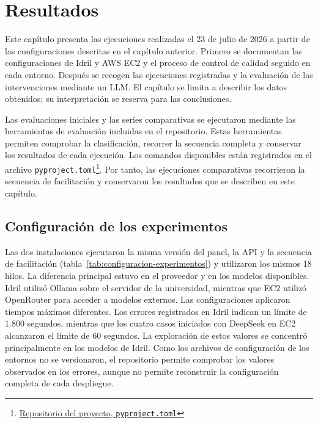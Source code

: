 \chapter{Resultados}
\label{chap:resultados}

Este capítulo presenta las ejecuciones realizadas el 23 de julio de 2026 a partir de las configuraciones descritas en el capítulo anterior. Primero se documentan las configuraciones de Idril y AWS EC2 y el proceso de control de calidad seguido en cada entorno. Después se recogen las ejecuciones registradas y la evaluación de las intervenciones mediante un LLM. El capítulo se limita a describir los datos obtenidos; su interpretación se reserva para las conclusiones.

Las evaluaciones iniciales y las series comparativas se ejecutaron mediante las herramientas de evaluación incluidas en el repositorio. Estas herramientas permiten comprobar la clasificación, recorrer la secuencia completa y conservar los resultados de cada ejecución. Los comandos disponibles están registrados en el archivo \texttt{pyproject.toml}\footnote{\href{https://github.com/magrimal/tfm-2026-discussion-moderation/blob/main/pyproject.toml}{Repositorio del proyecto, \texttt{pyproject.toml}}}. Por tanto, las ejecuciones comparativas recorrieron la secuencia de facilitación y conservaron los resultados que se describen en este capítulo.

\section{Configuración de los experimentos}

Las dos instalaciones ejecutaron la misma versión del panel, la API y la secuencia de facilitación (tabla~\ref{tab:configuracion-experimentos}) y utilizaron los mismos 18 hilos. La diferencia principal estuvo en el proveedor y en los modelos disponibles. Idril utilizó Ollama sobre el servidor de la universidad, mientras que EC2 utilizó OpenRouter para acceder a modelos externos. Las configuraciones aplicaron tiempos máximos diferentes. Los errores registrados en Idril indican un límite de 1.800 segundos, mientras que los cuatro casos iniciados con DeepSeek en EC2 alcanzaron el límite de 60 segundos. La exploración de estos valores se concentró principalmente en los modelos de Idril. Como los archivos de configuración de los entornos no se versionaron, el repositorio permite comprobar los valores observados en los errores, aunque no permite reconstruir la configuración completa de cada despliegue.

